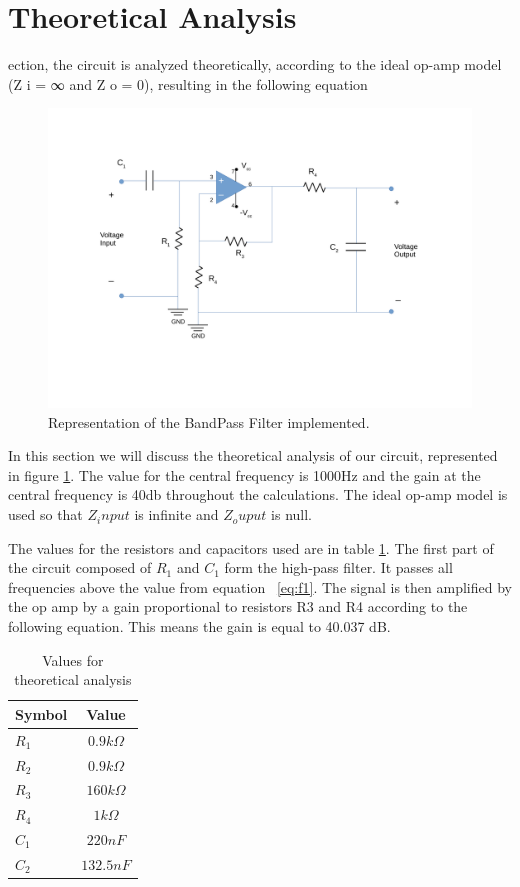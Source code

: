\newpage
\section{Theoretical Analysis}
\label{sec:analysis}

ection, the circuit is analyzed theoretically, according to the ideal op-amp model (Z i = ∞
and Z o = 0), resulting in the following equation
\begin{figure}[ht!] \centering
\includegraphics[width=0.95\linewidth]{DesenhoT5.pdf}
\caption{Representation of the BandPass Filter implemented.}
\label{fig:DesenhoT5}
\end{figure}

In this section we will discuss the theoretical analysis of our circuit, represented in figure \ref{fig:DesenhoT5}. The value for the central frequency is 1000Hz and the gain at the central frequency is 40db throughout the calculations. The ideal op-amp model is used so that $Z_input$ is infinite and $Z_ouput$ is null.

The values for the resistors and capacitors used are in table \ref{tab:values}. The first part of the circuit composed of $R_1$ and $C_1$ form the high-pass filter. It passes all frequencies above the value from equation ~\ref{eq:f1}. The signal is then amplified by the op amp by a gain proportional to resistors R3 and R4 according to the following equation. This means the gain is equal to 40.037 dB.
\begin{table}[h]
    \centering
    \begin{tabular}{|l|c|}
    \hline
    {\bf Symbol} & {\bf Value} \\ \hline
    $R_{1}$ & $0.9k\Omega$ \\ \hline
    $R_{2}$ & $0.9k\Omega$ \\ \hline
    $R_{3}$ & $160k\Omega$  \\ \hline
    $R_{4}$ & $1k\Omega$\\ \hline
    $C_{1}$ & $220nF$\\ \hline
    $C_{2}$ & $132.5nF$\\ \hline
    \end{tabular}
    \caption{Values for theoretical analysis}
    \label{tab:values}
\end{table}

